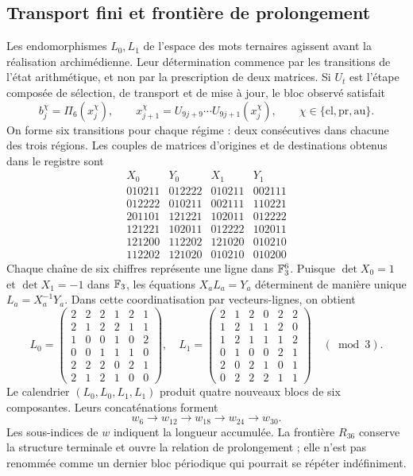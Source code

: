 \subsection{Transport fini et frontière de prolongement}

Les endomorphismes \(L_0,L_1\) de l'espace des mots ternaires agissent avant la réalisation archimédienne. Leur détermination commence par les transitions de l'état arithmétique, et non par la prescription de deux matrices. Si \(U_t\) est l'étape composée de sélection, de transport et de mise à jour, le bloc observé satisfait
\[
 b_j^\chi=\Pi_6(x_j^\chi),\qquad
 x_{j+1}^\chi=U_{9j+9}\cdots U_{9j+1}(x_j^\chi),
 \qquad \chi\in\{\mathrm{cl},\mathrm{pr},\mathrm{au}\}.
\]
On forme six transitions pour chaque régime : deux consécutives dans chacune des trois régions. Les couples de matrices d'origines et de destinations obtenus dans le registre sont
\[
\begin{array}{c|c|c|c}
X_0&Y_0&X_1&Y_1\\\hline
010211&012222&010211&002111\\
012222&010211&002111&110221\\
201101&121221&102011&012222\\
121221&102011&012222&102011\\
121200&112202&121020&010210\\
112202&121020&010210&010200
\end{array}
\]
Chaque chaîne de six chiffres représente une ligne dans \(\mathbb F_3^6\). Puisque \(\det X_0=1\) et \(\det X_1=-1\) dans \(\mathbb F_3\), les équations \(X_aL_a=Y_a\) déterminent de manière unique \(L_a=X_a^{-1}Y_a\). Dans cette coordinatisation par vecteurs-lignes, on obtient
\[
 L_0=\begin{pmatrix}
 2&2&2&1&2&1\\2&1&2&2&1&1\\1&0&0&1&0&2\\
 0&0&1&1&1&0\\2&2&2&0&2&1\\2&1&2&1&0&0
 \end{pmatrix},\quad
 L_1=\begin{pmatrix}
 2&1&2&0&2&2\\1&2&1&1&2&0\\1&2&1&1&1&2\\
 0&1&0&0&2&1\\2&0&2&1&0&1\\0&2&2&2&1&1
 \end{pmatrix}\quad(\bmod3).
\]
Le calendrier \((L_0,L_0,L_1,L_1)\) produit quatre nouveaux blocs de six composantes. Leurs concaténations forment
\[
 w_6\longrightarrow w_{12}\longrightarrow w_{18}
 \longrightarrow w_{24}\longrightarrow w_{30}.
\]
Les sous-indices de \(w\) indiquent la longueur accumulée. La frontière \(R_{36}\) conserve la structure terminale et ouvre la relation de prolongement ; elle n'est pas renommée comme un dernier bloc périodique qui pourrait se répéter indéfiniment.


